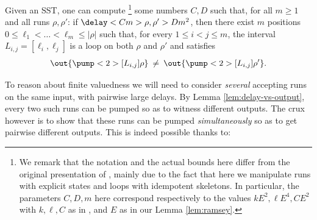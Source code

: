 \documentclass{article}
\begin{document}
\begin{lemma}[name={\cite[Lemma 6]{SSTdelay}}]\label{lem:delay-vs-output}%
Given an SST, one can compute%
\footnote{%
We remark that the notation and the actual bounds here 
differ from the original presentation of \cite{SSTdelay},
mainly due to the fact that here we manipulate runs
with explicit states and loops with idempotent skeletons.
In particular, the parameters $C,D,m$ here correspond respectively to 
the values $k E^2, \ell E^4, C E^2$ with $k,\ell,C$ as in \cite[Lemma 6]{SSTdelay}, and
 $E$ as in our Lemma \ref{lem:ramsey}.
}
some numbers $C,D$ such that, 
for all $m\ge 1$ and all runs $\rho,\rho'$:
if $\delay<C m>{\rho,\rho'} > D m^2$,
then there exist
$m$ positions $0\le \ell_1 < \dots < \ell_m \le |\rho|$ such that,
for every $1 \le i < j \le m$, the interval $L_{i,j}=[\ell_i,\ell_j]$
is a loop on both $\rho$ and $\rho'$ and satisfies
\[
  \out{\pump<2>[L_{i,j}]{\rho}} 
  \:\neq\: 
  \out{\pump<2>[L_{i,j}]{\rho'}} .
\]
\end{lemma}

To reason about finite valuedness we will need to consider 
\emph{several} accepting runs on the same input, with pairwise 
large delays.
By Lemma \ref{lem:delay-vs-output}, 
every two such runs can be pumped so as to witness different outputs. 
The crux however is to show that these runs can be pumped \emph{simultaneously} 
so as to get pairwise different outputs.
This is indeed possible thanks to: 
\end{document}
